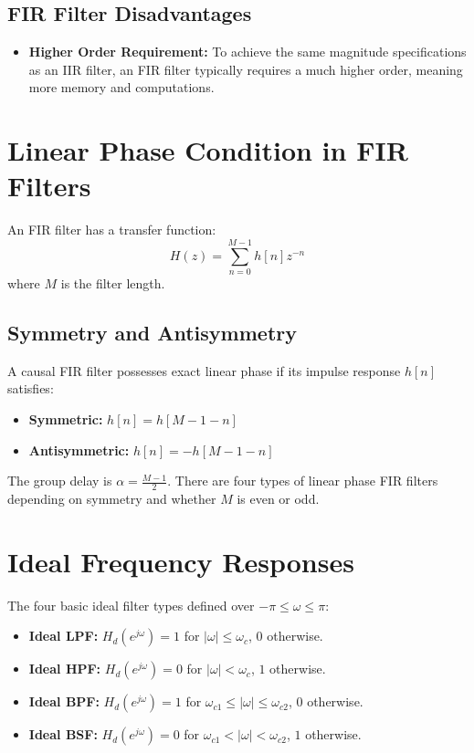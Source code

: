 \documentclass[11pt,a4paper]{article}
\begin{document}
\subsection{FIR Filter Disadvantages}
\begin{itemize}
    \item \textbf{Higher Order Requirement:} To achieve the same magnitude specifications as an IIR filter, an FIR filter typically requires a much higher order, meaning more memory and computations.
\end{itemize}

\section{Linear Phase Condition in FIR Filters}
An FIR filter has a transfer function:
\begin{equation}
H(z) = \sum_{n=0}^{M-1} h[n] z^{-n}
\end{equation}
where $M$ is the filter length.

\subsection{Symmetry and Antisymmetry}
A causal FIR filter possesses exact linear phase if its impulse response $h[n]$ satisfies:
\begin{itemize}
    \item \textbf{Symmetric:} $h[n] = h[M - 1 - n]$
    \item \textbf{Antisymmetric:} $h[n] = -h[M - 1 - n]$
\end{itemize}
The group delay is $\alpha = \frac{M-1}{2}$. There are four types of linear phase FIR filters depending on symmetry and whether $M$ is even or odd.

\section{Ideal Frequency Responses}
The four basic ideal filter types defined over $-\pi \le \omega \le \pi$:
\begin{itemize}
    \item \textbf{Ideal LPF:} $H_d(e^{j\omega}) = 1$ for $|\omega| \le \omega_c$, $0$ otherwise.
    \item \textbf{Ideal HPF:} $H_d(e^{j\omega}) = 0$ for $|\omega| < \omega_c$, $1$ otherwise.
    \item \textbf{Ideal BPF:} $H_d(e^{j\omega}) = 1$ for $\omega_{c1} \le |\omega| \le \omega_{c2}$, $0$ otherwise.
    \item \textbf{Ideal BSF:} $H_d(e^{j\omega}) = 0$ for $\omega_{c1} < |\omega| < \omega_{c2}$, $1$ otherwise.
\end{itemize}
\end{document}
